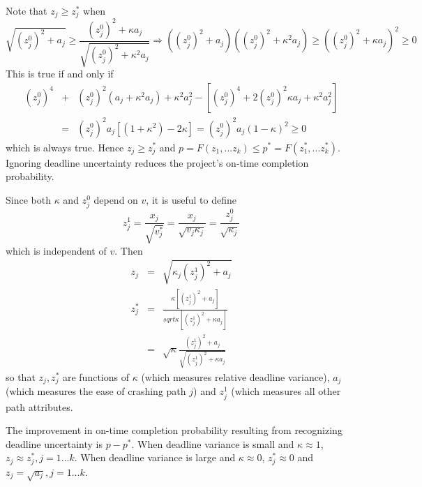 \documentclass[11pt]{article}
\begin{document}
 Note that $z_j \geq z^*_j$ when 
 $$\sqrt{(z^0_j)^2+a_j} \geq \frac{(z^0_j)^2 + \kappa a_j}
 {\sqrt{(z^0_j)^2+\kappa^2 a_j}}  \Longrightarrow ((z^0_j)^2+ a_j) ((z^0_j)^2 + \kappa^2 a_j) \geq ((z^0_j)^2 +\kappa a_j)^2  \geq 0 $$
This is true if and only if 
\begin{eqnarray*}
(z^0_j)^4 &+& (z^0_j)^2 (a_j + \kappa^2 a_j) + \kappa^2 a^2_j - [(z^0_j)^4 + 2 (z^0_j)^2 \kappa a_j + \kappa^2 a^2_j] \\ &=& 
  (z^0_j)^2 a_j[(1 + \kappa^2 ) - 2 \kappa] 
  =  (z^0_j)^2 a_j(1-\kappa)^2 \geq 0 
  \end{eqnarray*}
which is always true.  Hence $z_j \geq z^*_j$ and $p=F(z_1,...z_k) \leq p^*=F(z^*_1,...z^*_k) $.  Ignoring deadline uncertainty reduces the project's on-time completion probability. \par
Since both $\kappa$ and $z^0_j$ depend on $v$,   it is useful to define $$z^1_j=\frac{x_j}{\sqrt{v^*_j}}=
\frac{x_j}{\sqrt{v_j \kappa_j}} = \frac{z^0_j}{\sqrt{\kappa_j}} $$ 
which is independent of $v$.   Then 
\begin{eqnarray*}
z_j &=& \sqrt{\kappa_j(z^1_j)^2 + a_j} \\
z^*_j &=&  \frac{ \kappa[(z^1_j)^2+ a_j]}{sqrt{ \kappa[(z^1_j)^2 + \kappa a_j]}} \\  
&=& \sqrt{\kappa} \frac{(z^1_j)^2+ a_j}{\sqrt{(z^1_j)^2 + \kappa a_j}}  
\end{eqnarray*}
so that $z_j,z^*_j$ are functions of $\kappa$ (which measures relative deadline variance), $a_j$ (which measures the ease of crashing path $j$) and $z^1_j$ (which measures all other path attributes.\par
The improvement in on-time completion probability resulting from recognizing deadline uncertainty is $p-p^*$.  When deadline variance is small and $\kappa \approx 1$, $z_j \approx z^*_j, j=1...k$.  When deadline variance is large and $\kappa \approx 0$, $z^*_j \approx 0$ and $z_j=\sqrt{a_j}, j=1...k$.      
\end{document}

